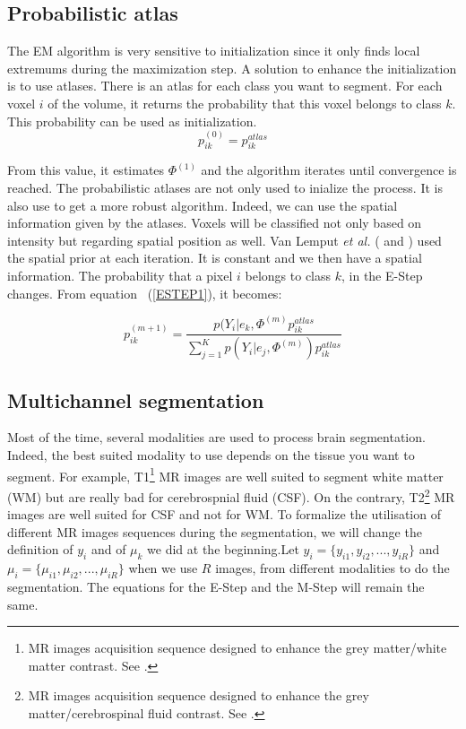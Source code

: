 \subsection{Probabilistic atlas}\label{spatial}
The EM algorithm is very sensitive to initialization since it only finds local extremums during the maximization step. A solution to enhance the initialization is to use atlases. There is an atlas for each class you want to segment. For each voxel $i$ of the volume, it returns the probability that this voxel belongs to class $k$. This probability can be used as initialization.
  \begin{equation*}
  p_{ik}^{(0)} = p_{ik}^{atlas}
  \end{equation*}   

From this value, it estimates $\Phi^{(1)}$ and the algorithm iterates until convergence is reached. The probabilistic atlases are not only used to inialize the process. It is also use to get a more robust algorithm. Indeed, we can use the spatial information given by the atlases. Voxels will be classified not only based on intensity but regarding spatial position as well. Van Lemput \textit{et al.} (\cite{8} and \cite{9}) used the spatial prior at each iteration. It is constant and we then have a spatial information. The probability that a pixel $i$ belongs to class $k$, in the E-Step changes. From equation ~(\ref{ESTEP1}), it becomes:

  \begin{equation*}\label{ESTEP2}
  p_{ik}^{(m+1)} = \frac{p(Y_i|e_k,\Phi^{(m)}p_{ik}^{atlas}}{\sum_{j=1}^K   p(Y_i|e_j,\Phi^{(m)}) p_{ik}^{atlas}}  
  \end{equation*}

%
\subsection{Multichannel segmentation}\label{multichannel}
Most of the time, several modalities are used to process brain segmentation. Indeed, the best suited modality to use depends on the tissue you want to segment. For example, T1\footnote{MR images acquisition sequence designed to enhance the grey matter/white matter contrast. See \cite{12}.} MR images are well suited to segment white matter (WM) but are really bad for cerebrospnial fluid (CSF). On the contrary, T2\footnote{MR images acquisition sequence designed to enhance the grey matter/cerebrospinal fluid contrast. See \cite{12}.} MR images are well suited for CSF and not for WM. To formalize the utilisation of different MR images sequences during the segmentation, we will change the definition of $y_i$ and of $\mu_k$ we did at the beginning.Let $y_i = \{y_{i1},y_{i2}, ..., y_{iR}\}$ and $\mu_i = \{\mu_{i1},\mu_{i2}, ..., \mu_{iR}\}$ when we use $R$ images, from different modalities to do the segmentation. The equations for the E-Step and the M-Step will remain the same.
%
